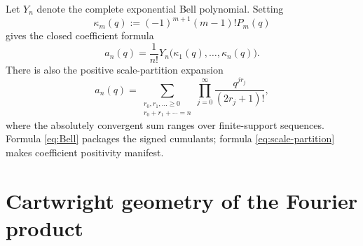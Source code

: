 \documentclass[11pt]{article}
\numberwithin{equation}{section}
\theoremstyle{definition}
\theoremstyle{remark}
\begin{document}
Let $Y_n$ denote the complete exponential Bell polynomial.  Setting
\begin{equation}\label{eq:kappa}
 \kappa_m(q):=(-1)^{m+1}(m-1)!P_m(q)
\end{equation}
gives the closed coefficient formula
\begin{equation}\label{eq:Bell}
 a_n(q)=\frac1{n!}Y_n\bigl(\kappa_1(q),\ldots,\kappa_n(q)\bigr).
\end{equation}
There is also the positive scale-partition expansion
\begin{equation}\label{eq:scale-partition}
 a_n(q)=
 \sum_{\substack{r_0,r_1,\ldots\ge0\\r_0+r_1+\cdots=n}}
 \prod_{j=0}^{\infty}\frac{q^{jr_j}}{(2r_j+1)!},
\end{equation}
where the absolutely convergent sum ranges over finite-support sequences.  Formula \eqref{eq:Bell} packages the signed cumulants; formula \eqref{eq:scale-partition} makes coefficient positivity manifest.

\begin{table}[htbp]
\centering
\caption{Exact coefficients, even moments, and multiplier terms.}
\label{tab:exact-coeff}
{\small\renewcommand{\arraystretch}{1.85}}
\end{table}

\section{Cartwright geometry of the Fourier product}\label{sec:cartwright}
\end{document}
